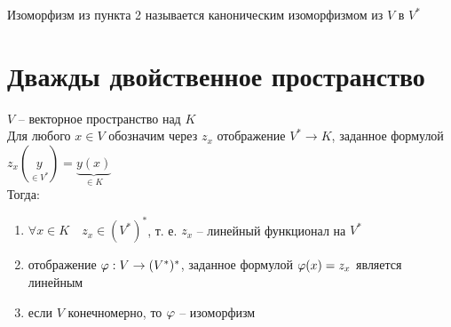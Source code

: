 \begin{definition}
	Изоморфизм из пункта 2 называется каноническим изоморфизмом из $ V $ в $ V^* $
\end{definition}

\section{Дважды двойственное пространство}

\begin{theorem}
	$ V $ -- векторное пространство над $ K $ \\
	Для любого $ x \in V $ обозначим через $ z_x $ отображение $ V^* \to K $, заданное формулой $ z_x(\underset{\in V^*}{y}) = \underbrace{y(x)}_{\in K} $ \\
	Тогда:
	\begin{enumerate}
		\item $ \forall x \in K \quad z_x \in (V^*)^* $, т. е. $ z_x $ -- линейный функционал на $ V^* $

		\item отображение $ \varphi : V \to (V^*)^* $, заданное формулой $ \varphi(x) = z_x $ является линейным

		\item если $ V $ конечномерно, то $ \varphi $ -- изоморфизм
	\end{enumerate}
\end{theorem}

